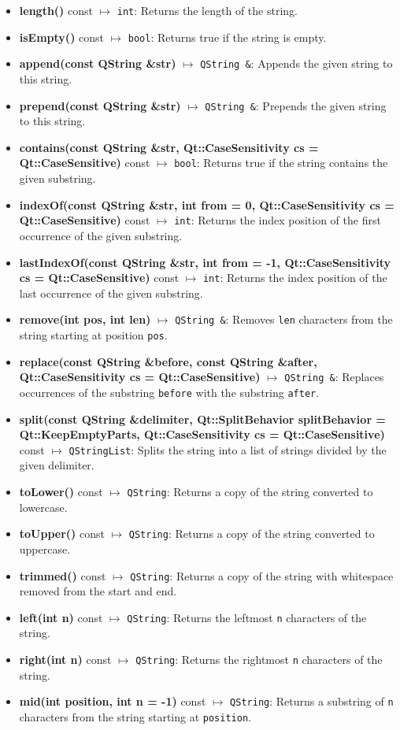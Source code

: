 \documentclass{report}
\begin{document}
    \pagebreak 
    \begin{itemize}
        \item \textbf{length()} const $\mapsto$ \texttt{int}: Returns the length of the string.
        \item \textbf{isEmpty()} const $\mapsto$ \texttt{bool}: Returns true if the string is empty.
        \item \textbf{append(const QString \&str)} $\mapsto$ \texttt{QString \&}: Appends the given string to this string.
        \item \textbf{prepend(const QString \&str)} $\mapsto$ \texttt{QString \&}: Prepends the given string to this string.
        \item \textbf{contains(const QString \&str, Qt::CaseSensitivity cs = Qt::CaseSensitive)} const $\mapsto$ \texttt{bool}: Returns true if the string contains the given substring.
        \item \textbf{indexOf(const QString \&str, int from = 0, Qt::CaseSensitivity cs = Qt::CaseSensitive)} const $\mapsto$ \texttt{int}: Returns the index position of the first occurrence of the given substring.
        \item \textbf{lastIndexOf(const QString \&str, int from = -1, Qt::CaseSensitivity cs = Qt::CaseSensitive)} const $\mapsto$ \texttt{int}: Returns the index position of the last occurrence of the given substring.
        \item \textbf{remove(int pos, int len)} $\mapsto$ \texttt{QString \&}: Removes \texttt{len} characters from the string starting at position \texttt{pos}.
        \item \textbf{replace(const QString \&before, const QString \&after, Qt::CaseSensitivity cs = Qt::CaseSensitive)} $\mapsto$ \texttt{QString \&}: Replaces occurrences of the substring \texttt{before} with the substring \texttt{after}.
        \item \textbf{split(const QString \&delimiter, Qt::SplitBehavior splitBehavior = Qt::KeepEmptyParts, Qt::CaseSensitivity cs = Qt::CaseSensitive)} const $\mapsto$ \texttt{QStringList}: Splits the string into a list of strings divided by the given delimiter.
        \item \textbf{toLower()} const $\mapsto$ \texttt{QString}: Returns a copy of the string converted to lowercase.
        \item \textbf{toUpper()} const $\mapsto$ \texttt{QString}: Returns a copy of the string converted to uppercase.
        \item \textbf{trimmed()} const $\mapsto$ \texttt{QString}: Returns a copy of the string with whitespace removed from the start and end.
        \item \textbf{left(int n)} const $\mapsto$ \texttt{QString}: Returns the leftmost \texttt{n} characters of the string.
        \item \textbf{right(int n)} const $\mapsto$ \texttt{QString}: Returns the rightmost \texttt{n} characters of the string.
        \item \textbf{mid(int position, int n = -1)} const $\mapsto$ \texttt{QString}: Returns a substring of \texttt{n} characters from the string starting at \texttt{position}.
    \end{itemize}
\end{document}
